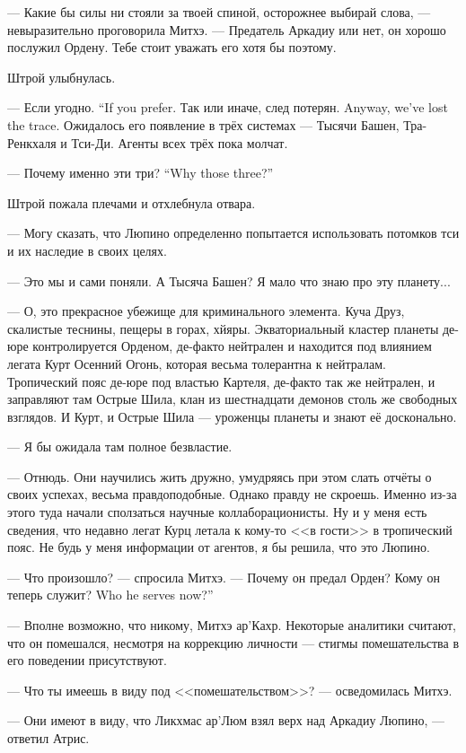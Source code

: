 --- Какие бы силы ни стояли за твоей спиной, осторожнее выбирай слова, --- невыразительно проговорила Митхэ.
--- Предатель Аркадиу или нет, он хорошо послужил Ордену.
Тебе стоит уважать его хотя бы поэтому.

Штрой улыбнулась.

{--- Если угодно.}
{``If you prefer.}
{Так или иначе, след потерян.}
{Anyway, we've lost the trace.}
Ожидалось его появление в трёх системах --- Тысячи Башен, Тра-Ренкхаля и Тси-Ди.
Агенты всех трёх пока молчат.

{--- Почему именно эти три?}
{``Why those three?''}

Штрой пожала плечами и отхлебнула отвара.

--- Могу сказать, что Люпино определенно попытается использовать потомков тси и их наследие в своих целях.

--- Это мы и сами поняли.
А Тысяча Башен?
Я мало что знаю про эту планету...

--- О, это прекрасное убежище для криминального элемента.
Куча Друз, скалистые теснины, пещеры в горах, хйяры.
Экваториальный кластер планеты де-юре контролируется Орденом, де-факто нейтрален и находится под влиянием легата Курт Осенний Огонь, которая весьма толерантна к нейтралам.
Тропический пояс де-юре под властью Картеля, де-факто так же нейтрален, и заправляют там Острые Шила, клан из шестнадцати демонов столь же свободных взглядов.
И Курт, и Острые Шила --- уроженцы планеты и знают её досконально.

--- Я бы ожидала там полное безвластие.

--- Отнюдь.
Они научились жить дружно, умудряясь при этом слать отчёты о своих успехах, весьма правдоподобные.
Однако правду не скроешь.
Именно из-за этого туда начали сползаться научные коллаборационисты.
Ну и у меня есть сведения, что недавно легат Курц летала к кому-то <<в гости>> в тропический пояс.
Не будь у меня информации от агентов, я бы решила, что это Люпино.

--- Что произошло? --- спросила Митхэ.
--- Почему он предал Орден?
{Кому он теперь служит?}
{Who he serves now?''}

--- Вполне возможно, что никому, Митхэ ар’Кахр.
Некоторые аналитики считают, что он помешался, несмотря на коррекцию личности --- стигмы помешательства в его поведении присутствуют.

--- Что ты имеешь в виду под <<помешательством>>? --- осведомилась Митхэ.

--- Они имеют в виду, что Ликхмас ар'Люм взял верх над Аркадиу Люпино, --- ответил Атрис.

